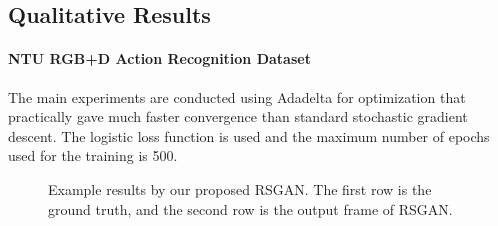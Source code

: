 \documentclass{article}
\begin{document}
\subsection{Qualitative Results}

\paragraph{NTU RGB+D Action Recognition Dataset}
The main experiments are conducted using Adadelta \cite{adaDelta2012} for optimization that practically gave much faster convergence than standard stochastic gradient descent. The logistic loss function is used and the maximum number of epochs used for the training is 500.

\begin{figure}[htbp]
    \centering
	\hfill
	\hfill
	\hfill
	\hfill
	\hfill
	\hfill
	
	\caption{Example results by our proposed RSGAN. The first row is the ground truth, and the second row is the output frame of RSGAN.} \label{fig:1}    

\end{figure}
\end{document}
